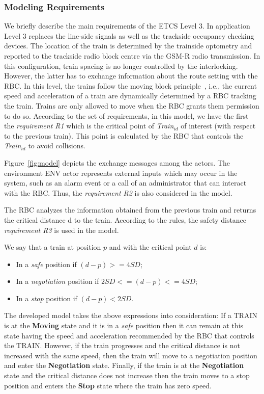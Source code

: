 \documentclass{template/openetcs_article}
\begin{document}
\subsubsection{Modeling Requirements}
We briefly describe the main requirements of the ETCS Level 3. In application Level 3 replaces the line-side signals as well as the trackside occupancy checking devices. The location of the train is determined by the trainside optometry and reported to the trackside radio block centre via the GSM-R radio transmission. In this configuration, train spacing is no longer controlled by the interlocking. However, the latter has to exchange information about the route setting with the RBC. In this level, the trains follow the moving block principle~\cite{platzer2009european}, i.e., the current speed and acceleration of a train are dynamically determined by a RBC tracking the train.  Trains are only allowed to move when the RBC grants them permission to do so. According to the set of requirements, in this model, we have the first the \textit{requirement R1} which is the critical point of \textit{Train$_{id}$} of interest (with respect to the previous train). This point is calculated by the RBC that controls the \textit{Train$_{id}$}  to avoid collisions. 

Figure~\ref{fig:model} depicts the exchange messages among the actors. The environment ENV actor represents external inputs which may occur in the system, such as an alarm event or a call of an administrator that can interact with the RBC. Thus, the \textit{requirement R2} is also considered in the model.

The RBC analyzes the information obtained from the previous train and returns the critical distance d to the train. According to the rules, the safety distance \textit{requirement R3} is used in the model.

We say that a train at position $p$ and with the critical point $d$ is:

\begin{itemize}
\item In a \textit{safe} position if $(d - p) >= 4 SD$;
\item In a \textit{negotiation} position if $2 SD <=  (d - p) <=  4 SD$;
\item In a \textit{stop} position if $(d - p) < 2 SD$.
\end{itemize}

The developed model takes the above expressions into consideration: If a TRAIN is at the \textbf{Moving} state and it is in a \textit{safe} position then it can remain at this state having the speed and acceleration recommended by the RBC that controls the TRAIN. However, if the train progresses and the critical distance is not increased with the same speed, then the train will move to a negotiation position and enter the \textbf{Negotiation} state. Finally, if the train is at the \textbf{Negotiation} state and the critical distance does not increase then the train moves to a stop position and enters the \textbf{Stop} state where the train has zero speed. 
\end{document}

